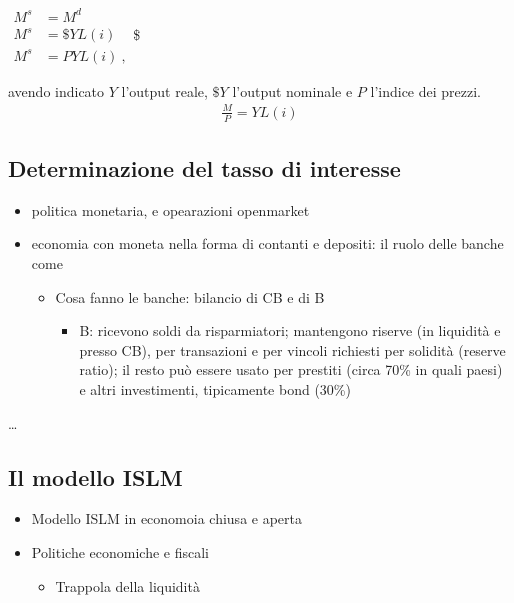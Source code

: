 \documentclass[letterpaper,10pt,italian]{jupyterBook}
\begin{document}
\sphinxAtStartPar
\(\begin{aligned}
  M^s & = M^d \\
  M^s & = \$ Y L(i) \\
  M^s & = P Y L(i) \ ,
\end{aligned}\)\$

\sphinxAtStartPar
avendo indicato \(Y\) l’output reale, \(\$ Y\) l’output nominale e \(P\) l’indice dei prezzi.
\begin{equation*}
\begin{split}\frac{M}{P} = Y L(i)\end{split}
\end{equation*}

\subsection{Determinazione del tasso di interesse}
\label{\detokenize{ch/macro:determinazione-del-tasso-di-interesse}}\begin{itemize}
\item {} 
\sphinxAtStartPar
politica monetaria, e opearazioni open\sphinxhyphen{}market

\item {} 
\sphinxAtStartPar
economia con moneta nella forma di contanti e depositi: il ruolo delle banche come 
\begin{itemize}
\item {} 
\sphinxAtStartPar
Cosa fanno le banche: bilancio di CB e di B
\begin{itemize}
\item {} 
\sphinxAtStartPar
B: ricevono soldi da risparmiatori; mantengono riserve (in liquidità e presso CB), per transazioni e per vincoli richiesti per solidità (reserve ratio); il resto può essere usato per prestiti (circa 70\% in quali paesi) e altri investimenti, tipicamente bond (30\%)

\end{itemize}

\end{itemize}

\end{itemize}

\sphinxAtStartPar
{}…


\subsection{Il modello IS\sphinxhyphen{}LM}
\label{\detokenize{ch/macro:il-modello-is-lm}}\label{\detokenize{ch/macro:economics-hs-macro-short-run-is-lm}}\begin{itemize}
\item {} 
\sphinxAtStartPar
Modello IS\sphinxhyphen{}LM in economoia chiusa e aperta

\item {} 
\sphinxAtStartPar
Politiche economiche e fiscali
\begin{itemize}
\item {} 
\sphinxAtStartPar
Trappola della liquidità

\end{itemize}

\end{itemize}
\end{document}
